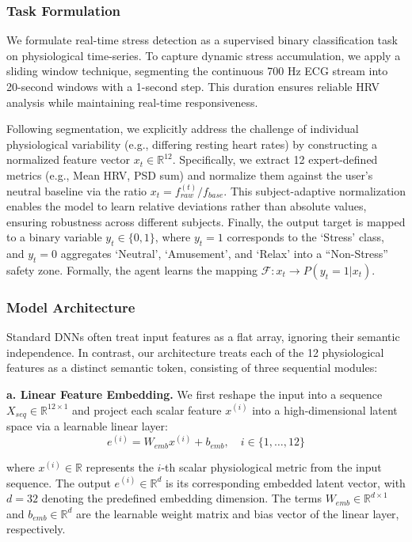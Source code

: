 \documentclass[journal,twoside,web]{ieeecolor}
\begin{document}
\subsubsection{Task Formulation}
We formulate real-time stress detection as a supervised binary classification task on physiological time-series. 
To capture dynamic stress accumulation, we apply a sliding window technique, segmenting the continuous 700 Hz ECG stream into 20-second windows with a 1-second step. This duration ensures reliable HRV analysis while maintaining real-time responsiveness.

Following segmentation, we explicitly address the challenge of individual physiological variability (e.g., differing resting heart rates) by constructing a normalized feature vector $x_t \in \mathbb{R}^{12}$.  Specifically, we extract 12 expert-defined metrics (e.g., Mean HRV, PSD sum) and normalize them against the user's neutral baseline via the ratio $x_t = f_{raw}^{(t)} / f_{base}$. This subject-adaptive normalization enables the model to learn relative deviations rather than absolute values, ensuring robustness across different subjects. Finally, the output target is mapped to a binary variable $y_t \in \{0, 1\}$, where $y_t=1$ corresponds to the `Stress' class, and $y_t=0$ aggregates `Neutral', `Amusement', and `Relax' into a ``Non-Stress'' safety zone.  Formally, the agent learns the mapping $\mathcal{F}: x_t \rightarrow P(y_t=1 | x_t)$.

\subsubsection{Model Architecture}
Standard DNNs often treat input features as a flat array, ignoring their semantic independence. In contrast, our architecture treats each of the 12 physiological features as a distinct semantic token, consisting of three sequential modules:

\textbf{a. Linear Feature Embedding.}
We first reshape the input into a sequence $X_{seq} \in \mathbb{R}^{12 \times 1}$ and project each scalar feature $x^{(i)}$ into a high-dimensional latent space via a learnable linear layer:
\begin{equation}
e^{(i)} = W_{emb} x^{(i)} + b_{emb}, \quad i \in \{1, \dots, 12\}
\end{equation}

where $x^{(i)} \in \mathbb{R}$ represents the $i$-th scalar physiological metric from the input sequence. The output $e^{(i)} \in \mathbb{R}^{d}$ is its corresponding embedded latent vector, with $d=32$ denoting the predefined embedding dimension. The terms $W_{emb} \in \mathbb{R}^{d \times 1}$ and $b_{emb} \in \mathbb{R}^{d}$ are the learnable weight matrix and bias vector of the linear layer, respectively. 
\end{document}
